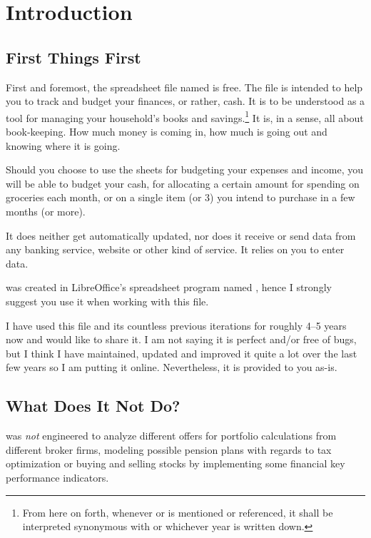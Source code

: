 \section{Introduction}
\label{sec:introduction}

\subsection{First Things First}
\label{subsec:first-things-first}

First and foremost, the spreadsheet file named  is free.
The file is intended to help you to track and budget your finances, or rather, cash.
It is to be understood as a tool for managing your household's books and savings.\footnote{From here on forth, whenever  or \begriff{\tfn} is mentioned or referenced, it shall be interpreted synonymous with  or whichever year is written down.}
It is, in a sense, all about book-keeping.
How much money is coming in, how much is going out and knowing where it is going.

Should you choose to use the sheets for budgeting your expenses and income, you will be able to budget your cash, \eg for allocating a certain amount for spending on groceries each month, or on a single item (or 3) you intend to purchase in a few months (or more).

It does neither get automatically updated, nor does it receive or send data from any banking service, website or other kind of service.
It relies on you to enter data.

\tfn was created in LibreOffice's spreadsheet program named , hence I strongly suggest you use it when working with this file.

I have used this file and its countless previous iterations for roughly 4--5 years now and would like to share it.
I am not saying it is perfect and/or free of bugs, but I think I have maintained, updated and improved it quite a lot over the last few years so I am putting it online.
Nevertheless, it is provided to you as-is.

\subsection{What Does It Not Do?}
\label{subsec:not-included}

\tfn was \emph{not} engineered to analyze different offers for portfolio calculations from different broker firms, modeling possible pension plans with regards to tax optimization or buying and selling stocks by implementing some financial key performance indicators.

